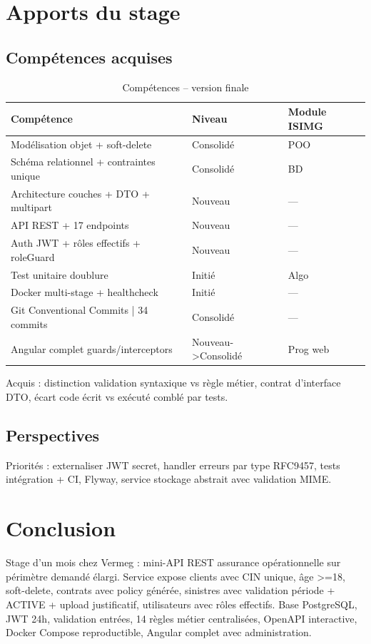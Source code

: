\documentclass[a4paper,12pt]{article}
\begin{document}
\section{Apports du stage}
\subsection{Compétences acquises}
\begin{table}[htbp]
\centering
\caption{Compétences -- version finale}
\label{tab:comp}
\small
\begin{tabularx}{\linewidth}{@{}X L{2.6cm} L{4.6cm}@{}}
\toprule
\textbf{Compétence} & \textbf{Niveau} & \textbf{Module ISIMG} \\
\midrule
Modélisation objet + soft-delete & Consolidé & POO \\
Schéma relationnel + contraintes unique & Consolidé & BD \\
Architecture couches + DTO + multipart & Nouveau & --- \\
API REST + 17 endpoints & Nouveau & --- \\
Auth JWT + rôles effectifs + roleGuard & Nouveau & --- \\
Test unitaire doublure & Initié & Algo \\
Docker multi-stage + healthcheck & Initié & --- \\
Git Conventional Commits | 34 commits & Consolidé & --- \\
Angular complet guards/interceptors & Nouveau->Consolidé & Prog web \\
\bottomrule
\end{tabularx}
\end{table}

Acquis : distinction validation syntaxique vs règle métier, contrat d'interface DTO, écart code écrit vs exécuté comblé par tests.

\subsection{Perspectives}
Priorités : externaliser JWT secret, handler erreurs par type RFC9457, tests intégration + CI, Flyway, service stockage abstrait avec validation MIME.

\section*{Conclusion}
Stage d'un mois chez Vermeg : mini-API REST assurance opérationnelle sur périmètre demandé élargi. Service expose clients avec CIN unique, âge >=18, soft-delete, contrats avec policy générée, sinistres avec validation période + ACTIVE + upload justificatif, utilisateurs avec rôles effectifs. Base PostgreSQL, JWT 24h, validation entrées, 14 règles métier centralisées, OpenAPI interactive, Docker Compose reproductible, Angular complet avec administration.
\end{document}
